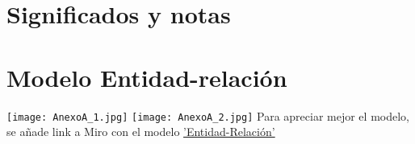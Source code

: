 \documentclass{report}
\begin{document}
\chapter{Significados y notas}
\theendnotes


\appendix
\chapter{Modelo Entidad-relación} \label{Entidad_Relacion}
\texttt{[image: AnexoA\_1.jpg]}
\newpage
\texttt{[image: AnexoA\_2.jpg]}
\newline
\newline
Para apreciar mejor el modelo, se añade link a Miro con el modelo \href{https://miro.com/welcomeonboard/cm95QTlodklVRjI5cEtYaUF5UmprejR0OEpEazk3dzRmVkYxZ2hrVFdmVmc2RDl5NVpjeTdwenRYQThsSm9VdHwzMDc0NDU3MzQ4NTY5OTQ5NzE0}{'Entidad-Relación'}
\end{document}
